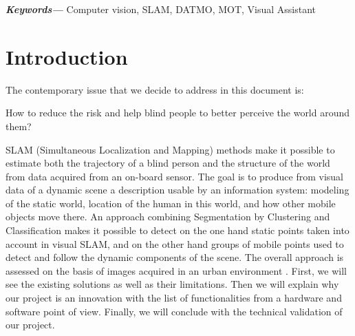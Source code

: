 \documentclass[conference,compsoc]{IEEEtran}
\providecommand{\keywords}[1]
{
  \small	
  \textbf{\textit{Keywords---}} #1
}
\begin{document}
\hspace{10pt}

\keywords{Computer vision, SLAM, DATMO, MOT, Visual Assistant}



%
\IEEEpeerreviewmaketitle



\section{Introduction}
The contemporary issue that we decide to address in this document is:

How to reduce the risk and help blind people to better perceive the world around them?

SLAM (Simultaneous Localization and Mapping) \cite{mozos2007interest} methods make it possible to estimate both the trajectory of a blind person and the structure of the world from data acquired from an on-board sensor. The goal is to produce from visual data of a dynamic scene a description usable by an information system: modeling of the static world, location of the human in this world, and how other mobile objects move there. An approach combining Segmentation by Clustering and Classification makes it possible to detect on the one hand static points taken into account in visual SLAM, and on the other hand groups of mobile points used to detect and follow the dynamic components of the scene. The overall approach is assessed on the basis of images acquired in an urban environment \cite{gil2010comparative}. First, we will see the existing solutions as well as their limitations. Then we will explain why our project is an innovation with the list of functionalities from a hardware and software point of view. Finally, we will conclude with the technical validation of our project.
\end{document}
